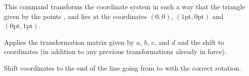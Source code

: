   

\begin{command}{\pgftransformtriangle{}}
  This command transforms the coordinate system in such a way that the
  triangle given by the points ,  and  lies at
  the coordinates $(0,0)$, $(1\mathrm{pt},0\mathrm{pt})$ and
  $(0\mathrm{pt},1\mathrm{pt})$. 
\begin{codeexample}[]
\end{codeexample}
\end{command}

  
\begin{command}{\pgftransformcm{}}
  Applies the transformation matrix given by $a$, $b$, $c$, and $d$
  and the shift  to coordinates (in addition to any
  previous transformations already in force).
\begin{codeexample}[]
\end{codeexample}
\end{command}

  
\begin{command}{\pgftransformarrow{}}
  Shift coordinates to the end of the line going from  
  to  with the correct rotation. 
\begin{codeexample}[]
\end{codeexample}
\end{command}

